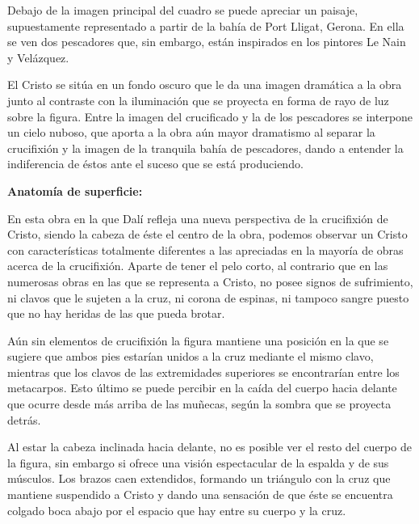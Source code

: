 Debajo de la imagen principal del cuadro se puede apreciar un paisaje, supuestamente representado a partir de la bahía de Port Lligat, Gerona. En ella se ven dos pescadores que, sin embargo, están inspirados en los pintores Le Nain y Velázquez. %

El Cristo se sitúa en un fondo oscuro que le da una imagen dramática a la obra junto al contraste con la iluminación que se proyecta en forma de rayo de luz sobre la figura. Entre la imagen del crucificado y la de los pescadores se interpone un cielo nuboso, que aporta a la obra aún mayor dramatismo al separar la crucifixión y la imagen de la tranquila bahía de pescadores, dando a entender la indiferencia de éstos ante el suceso que se está produciendo.


\vspace{12pt}
\textbf{Anatomía de superficie:}

En esta obra en la que Dalí refleja una nueva perspectiva de la crucifixión de Cristo, siendo la cabeza de éste el centro de la obra, podemos observar un Cristo con características totalmente diferentes a las apreciadas en la mayoría de obras acerca de la crucifixión. Aparte de tener el pelo corto, al contrario que en las numerosas obras en las que se representa a Cristo, no posee signos de sufrimiento, ni clavos que le sujeten a la cruz, ni corona de espinas, ni tampoco sangre puesto que no hay heridas de las que pueda brotar.

Aún sin elementos de crucifixión la figura mantiene una posición en la que se sugiere que ambos pies estarían unidos a la cruz mediante el mismo clavo, mientras que los clavos de las extremidades superiores se encontrarían entre los metacarpos. Esto último se puede percibir en la caída del cuerpo hacia delante que ocurre desde más arriba de las muñecas, según la sombra que se proyecta detrás.

Al estar la cabeza inclinada hacia delante, no es posible ver el resto del cuerpo de la figura, sin embargo si ofrece una visión espectacular de la espalda y de sus músculos. Los brazos caen extendidos, formando un triángulo con la cruz que mantiene suspendido a Cristo y dando una sensación de que éste se encuentra colgado boca abajo por el espacio que hay entre su cuerpo y la cruz.

